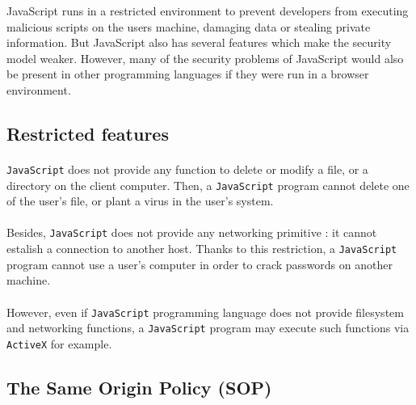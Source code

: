 JavaScript runs in a restricted environment to prevent developers from executing malicious scripts on the users machine, damaging data or stealing private information. But JavaScript also has several features which make the security model weaker. However, many of the security problems of JavaScript would also be present in other programming languages if they were run in a browser environment.

\subsection{Restricted features}

\paragraph{}
\texttt{JavaScript} does not provide any function to delete or modify a file, or a directory on the client computer. Then, a \texttt{JavaScript} program cannot delete one of the user's file, or plant a virus in the user's system.

\paragraph{}
Besides, \texttt{JavaScript} does not provide any networking primitive : it cannot estalish a connection to another host. Thanks to this restriction, a \texttt{JavaScript} program cannot use a user's computer in order to crack passwords on another machine.

\paragraph{}
However, even if \texttt{JavaScript} programming language does not provide filesystem and networking functions, a \texttt{JavaScript} program may execute such functions via \texttt{ActiveX} for example.

\subsection{The Same Origin Policy (SOP)}

